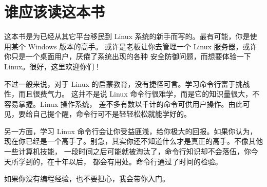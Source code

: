 \section{谁应该读这本书} %
\label{sec:谁应该读这本书}

这本书是为已经从其它平台移民到 Linux 系统的新手而写的。最有可能，你是使用某个 Windows 版本的高手。 或许是老板让你去管理一个 Linux 服务器，或许你只是一个桌面用户，厌倦了系统出现的各种 安全防御问题，而想要体验一下 Linux。很好，这里欢迎你们！

\par 不过一般来说，对于 Linux 的启蒙教育，没有捷径可言。学习命令行富于挑战性，而且很费气力。 这并不是说 Linux 命令行很难学，而是它的知识量很大，不容易掌握。Linux 操作系统， 差不多有数以千计的命令可供用户操作。由此可见，要给自己提个醒，命令行可不是轻轻松松就能学好的。

\par 另一方面，学习 Linux 命令行会让你受益匪浅，给你极大的回报。如果你认为， 现在你已经是一个高手了。别急，其实你还不知道什么才是真正的高手。不像其他一些计算机技能， 一段时间之后可能就被淘汰了，命令行知识却不会落伍，你今天所学到的，在十年以后， 都会有用处。命令行通过了时间的检验。

\par 如果你没有编程经验，也不要担心，我会带你入门。
